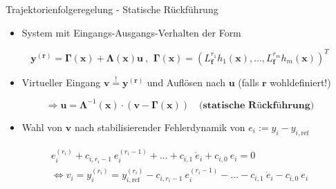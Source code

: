 \documentclass[
	ngerman,
	10pt,				%
	aspectratio=169 	%
]{beamer}
\begin{document}

\begin{frame}[t,fragile,label=trajektorienregelung_3]{\large Trajektorienfolgeregelung - Statische Rückführung}
	
	\begin{itemize}
		\item System mit Eingangs-Ausgangs-Verhalten der Form
	\end{itemize}
	\begin{equation*}
		\mathbf{y}^{(\mathbf{r})} = \boldsymbol{\Gamma}(\mathbf{x}) + \boldsymbol{\Lambda}(\mathbf{x}) \mathbf{u} \ \text{, } \ \boldsymbol{\Gamma}(\mathbf{x}) = (L_{\mathbf{f}}^{r_1} h_1(\mathbf{x}), ..., L_{\mathbf{f}}^{r_m} h_m(\mathbf{x}))^T
	\end{equation*}
	\pause
	\begin{itemize}
		\item Virtueller Eingang $\mathbf{v} \stackrel{!}{=} \mathbf{y}^{(\mathbf{r})}$ und Auflösen nach $\mathbf{u}$ (falls $\mathbf{r}$ wohldefiniert!)
	\end{itemize}
	\pause
	\begin{equation*}
		\Rightarrow \mathbf{u} = \boldsymbol{\Lambda }^{-1}(\mathbf{x}) \cdot (\mathbf{v} - \boldsymbol{\Gamma}(\mathbf{x})) \quad \textbf{(statische Rückführung)}
	\end{equation*}
	\begin{itemize}
		\item Wahl von $\mathbf{v}$ nach stabilisierender Fehlerdynamik von $e_i := y_i - y_{i, \text{ref}}$
	\end{itemize}
	\begin{align*}
			e_i^{(r_i)} + c_{i, r_i-1} \ e_i^{(r_i-1)} + ... + c_{i, 1} \ \dot{e}_i + c_{i, 0} \ e_i = 0 \\
			\Leftrightarrow v_i = y_i^{(r_i)} = y_{i, \text{ref}}^{(r_i)} - c_{i, r_i-1} \ e_i^{(r_i-1)} - ... - c_{i, 1} \ \dot{e}_i - c_{i, 0} \ e_i
	\end{align*}


\end{frame}
\end{document}
